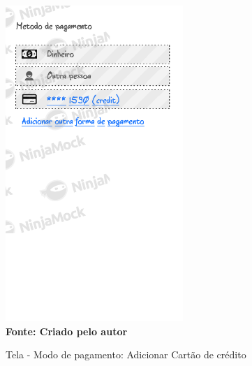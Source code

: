 \begin{figure}[ht]
	\centering	
	\caption[\hspace{0.1cm}]{Tela - Modo de pagamento: Adicionar Cartão de crédito}
	\vspace{-0.4cm}
	\includegraphics[width=0.6\textwidth]{figuras/c_payment.png}
	 \vspace{-0.2cm}
	\\\textbf{\footnotesize Fonte: Criado pelo autor }
	\label{fig:w5}
\end{figure}
\vspace{-0.5cm}


